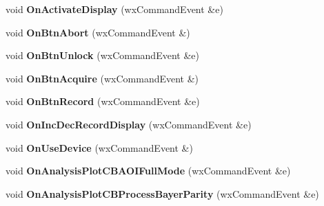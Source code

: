 \begin{DoxyCompactItemize}
\item 
\hypertarget{class_prop_view_frame_a33be72ba8891f77444893014150216bd}{void {\bfseries On\+Activate\+Display} (wx\+Command\+Event \&e)}\label{class_prop_view_frame_a33be72ba8891f77444893014150216bd}

\item 
\hypertarget{class_prop_view_frame_a27ec60bb20a07b49787ada455b56b4f2}{void {\bfseries On\+Btn\+Abort} (wx\+Command\+Event \&)}\label{class_prop_view_frame_a27ec60bb20a07b49787ada455b56b4f2}

\item 
\hypertarget{class_prop_view_frame_ae3cfdf662d220616b1abffb58c0783ce}{void {\bfseries On\+Btn\+Unlock} (wx\+Command\+Event \&e)}\label{class_prop_view_frame_ae3cfdf662d220616b1abffb58c0783ce}

\item 
\hypertarget{class_prop_view_frame_a6d0ca0f5e5f740178feae5c3de3ea084}{void {\bfseries On\+Btn\+Acquire} (wx\+Command\+Event \&)}\label{class_prop_view_frame_a6d0ca0f5e5f740178feae5c3de3ea084}

\item 
\hypertarget{class_prop_view_frame_a10ab945e732b9142b60d26b4219ecb59}{void {\bfseries On\+Btn\+Record} (wx\+Command\+Event \&e)}\label{class_prop_view_frame_a10ab945e732b9142b60d26b4219ecb59}

\item 
\hypertarget{class_prop_view_frame_ada65f27835c6da61b950e272a469a2bc}{void {\bfseries On\+Inc\+Dec\+Record\+Display} (wx\+Command\+Event \&e)}\label{class_prop_view_frame_ada65f27835c6da61b950e272a469a2bc}

\item 
\hypertarget{class_prop_view_frame_ad8be201c706a67cb02edcbea614e8bb8}{void {\bfseries On\+Use\+Device} (wx\+Command\+Event \&)}\label{class_prop_view_frame_ad8be201c706a67cb02edcbea614e8bb8}

\item 
\hypertarget{class_prop_view_frame_a0f90897f4ca915590e4832f6b996808c}{void {\bfseries On\+Analysis\+Plot\+C\+B\+A\+O\+I\+Full\+Mode} (wx\+Command\+Event \&e)}\label{class_prop_view_frame_a0f90897f4ca915590e4832f6b996808c}

\item 
\hypertarget{class_prop_view_frame_a666d720c72c9a0c0438618bdd116f390}{void {\bfseries On\+Analysis\+Plot\+C\+B\+Process\+Bayer\+Parity} (wx\+Command\+Event \&e)}\label{class_prop_view_frame_a666d720c72c9a0c0438618bdd116f390}


\end{DoxyCompactItemize}
